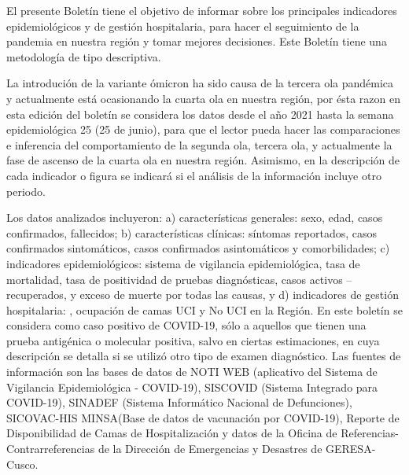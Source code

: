 \documentclass[12pt,a4paper,openany]{book}
\begin{document}
	\noindent El presente Boletín tiene el objetivo de informar sobre los principales indicadores epidemiológicos y
	de gestión hospitalaria, para hacer el seguimiento de la pandemia en nuestra región y tomar mejores decisiones. Este Boletín tiene una metodología de tipo descriptiva.
	
	
	La introdución de la variante ómicron ha sido causa de la tercera ola pandémica y actualmente está ocasionando la cuarta ola en nuestra región, por ésta razon en esta edición del boletín se considera los datos desde el año 2021 hasta la
	semana epidemiológica  25 (25 de junio), para que el lector pueda hacer las comparaciones
	e inferencia del comportamiento de la segunda ola, tercera ola, y actualmente la fase de ascenso de la cuarta ola
	en nuestra región. Asimismo, en la descripción de cada indicador o figura se indicará si el análisis de
	la información incluye otro periodo.
	
	
	Los datos analizados incluyeron: a) características generales: sexo, edad, casos confirmados,
	fallecidos; b) características clínicas: síntomas reportados, casos confirmados sintomáticos, casos
	confirmados asintomáticos y comorbilidades; c) indicadores epidemiológicos: sistema de vigilancia
	epidemiológica, tasa de mortalidad, tasa de positividad de pruebas diagnósticas, casos activos –
	recuperados, y exceso de muerte por todas las causas, y d) indicadores de gestión hospitalaria: ,
	ocupación de camas UCI y No UCI en la Región. En este boletín se considera como caso positivo de
	COVID-19, sólo a aquellos que tienen una prueba antigénica o molecular positiva, salvo en ciertas
	estimaciones, en cuya descripción se detalla si se utilizó otro tipo de examen diagnóstico.
	Las fuentes de información son las bases de datos de NOTI WEB (aplicativo del Sistema de
	Vigilancia Epidemiológica - COVID-19), SISCOVID (Sistema Integrado para COVID-19), SINADEF
	(Sistema Informático Nacional de Defunciones), SICOVAC-HIS MINSA(Base de datos de vacunación
	por COVID-19), Reporte de Disponibilidad de Camas de Hospitalización y datos de la Oficina de
	Referencias-Contrarreferencias de la Dirección de Emergencias y Desastres de GERESA-Cusco.
	
	
\end{document}
